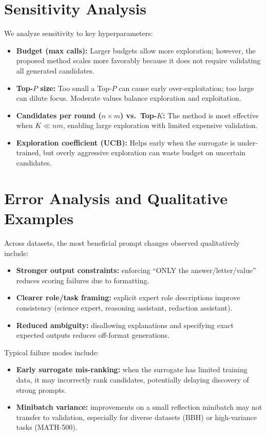 \section{Sensitivity Analysis}
We analyze sensitivity to key hyperparameters:
\begin{itemize}
    \item \textbf{Budget (max calls):} Larger budgets allow more exploration; however, the proposed method scales more favorably because it does not require validating all generated candidates.
    \item \textbf{Top-$P$ size:} Too small a Top-$P$ can cause early over-exploitation; too large can dilute focus. Moderate values balance exploration and exploitation.
    \item \textbf{Candidates per round ($n \times m$) vs.\ Top-$K$:} The method is most effective when $K \ll n m$, enabling large exploration with limited expensive validation.
    \item \textbf{Exploration coefficient (UCB):} Helps early when the surrogate is under-trained, but overly aggressive exploration can waste budget on uncertain candidates.
\end{itemize}

\section{Error Analysis and Qualitative Examples}
Across datasets, the most beneficial prompt changes observed qualitatively include:
\begin{itemize}
    \item \textbf{Stronger output constraints:} enforcing ``ONLY the answer/letter/value'' reduces scoring failures due to formatting.
    \item \textbf{Clearer role/task framing:} explicit expert role descriptions improve consistency (science expert, reasoning assistant, redaction assistant).
    \item \textbf{Reduced ambiguity:} disallowing explanations and specifying exact expected outputs reduces off-format generations.
\end{itemize}

Typical failure modes include:
\begin{itemize}
    \item \textbf{Early surrogate mis-ranking:} when the surrogate has limited training data, it may incorrectly rank candidates, potentially delaying discovery of strong prompts.
    \item \textbf{Minibatch variance:} improvements on a small reflection minibatch may not transfer to validation, especially for diverse datasets (BBH) or high-variance tasks (MATH-500).
\end{itemize}

